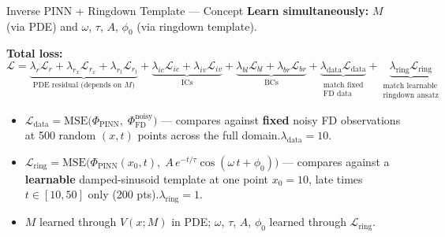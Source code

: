\documentclass[aspectratio=169, 11pt]{beamer}
\begin{document}
\begin{frame}{Inverse PINN + Ringdown Template --- Concept}
  \textbf{Learn simultaneously:} $M$ (via PDE) and $\omega$, $\tau$, $A$, $\phi_0$
  (via ringdown template).

  \medskip
  \textbf{Total loss:}
  \[
    \mathcal{L} = \underbrace{\lambda_r\mathcal{L}_r + \lambda_{r_x}\mathcal{L}_{r_x}
    + \lambda_{r_t}\mathcal{L}_{r_t}}_{\text{PDE residual (depends on $M$)}}
    + \underbrace{\lambda_{ic}\mathcal{L}_{ic} + \lambda_{iv}\mathcal{L}_{iv}}_{\text{ICs}}
    + \underbrace{\lambda_{bl}\mathcal{L}_{bl} + \lambda_{br}\mathcal{L}_{br}}_{\text{BCs}}
    + \underbrace{\lambda_{\text{data}}\mathcal{L}_{\text{data}}}_{\substack{\text{match fixed}\\\text{FD data}}}
    + \underbrace{\lambda_{\text{ring}}\mathcal{L}_{\text{ring}}}_{\substack{\text{match learnable}\\\text{ringdown ansatz}}}
  \]

  \begin{itemize}
    \item $\mathcal{L}_{\text{data}} = \text{MSE}\!\bigl(\Phi_{\text{PINN}},\;\Phi_{\text{FD}}^{\text{noisy}}\bigr)$
          --- compares against \textbf{fixed} noisy FD observations
          at 500 random $(x,t)$ points across the full domain.\quad $\lambda_{\text{data}} = 10$.
    \item $\mathcal{L}_{\text{ring}} = \text{MSE}\!\bigl(\Phi_{\text{PINN}}(x_0, t),\;
          A\,e^{-t/\tau}\cos(\omega\,t + \phi_0)\bigr)$
          --- compares against a \textbf{learnable} damped-sinusoid template
          at one point $x_0\!=\!10$, late times $t \in [10, 50]$ only (200 pts).\quad $\lambda_{\text{ring}} = 1$.
    \item $M$ learned through $V(x; M)$ in PDE; \;$\omega$, $\tau$, $A$, $\phi_0$ learned through $\mathcal{L}_{\text{ring}}$.
  \end{itemize}
\end{frame}
\end{document}
